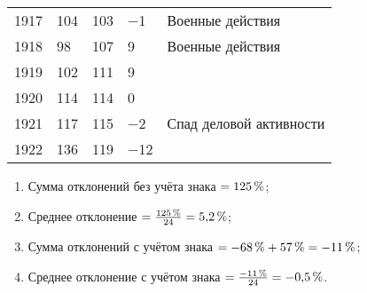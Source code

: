\documentclass[leqno]{article}  %
\begin{document}
\begin{table}
{\begin{tabular}{p{}|p{}|p{}|p{}|p{}}
1917 & \hfill 104 \hspace*{6mm} & \hfill 103 \hspace*{6mm} & \hfill \(-\)1 \hspace*{6mm} & Военные действия \\
1918 & \hfill 98 \hspace*{6mm} & \hfill 107 \hspace*{6mm} & \hfill 9 \hspace*{6mm} & Военные действия \\
1919 & \hfill 102 \hspace*{6mm} & \hfill 111 \hspace*{6mm} & \hfill 9 \hspace*{6mm} & \\
1920 & \hfill 114 \hspace*{6mm} & \hfill 114 \hspace*{6mm} & \hfill 0 \hspace*{6mm} & \\
1921 & \hfill 117 \hspace*{6mm} & \hfill 115 \hspace*{6mm} & \hfill \(-\)2 \hspace*{6mm} & Спад деловой активности \\
1922 & \hfill 136 \hspace*{6mm} & \hfill 119 \hspace*{6mm} & \hfill \(-\)12 \hspace*{6mm} & \\
\hline
\end{tabular}

\par

\begin{enumerate}[{(1)}]
\item Сумма отклонений без учёта знака \(= 125\text{\,\%}\);
\item Среднее отклонение \(= \frac{125\text{\,\%}}{24} = 5,\!2\text{\,\%}\);
\item Сумма отклонений с учётом знака \(= -68\text{\,\%}+57\text{\,\%} = -11\text{\,\%}\);
\item Среднее отклонение с учётом знака \(= \frac{-11\text{\,\%}}{24} = -0,\!5\text{\,\%}\).
\end{enumerate}
}
\end{table}
\end{document}

